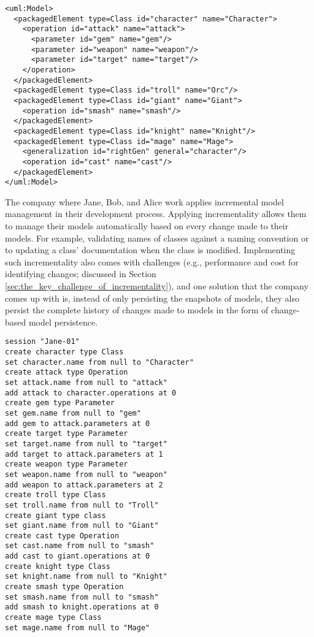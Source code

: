 \vspace{-20pt}
\begin{lstlisting}[style=xmi,caption={Simplified XMI file of the right version of Figure \ref{fig:class_diagram_right}.},label=lst:xmimodel_right]
<uml:Model>
  <packagedElement type=Class id="character" name="Character">
    <operation id="attack" name="attack">
      <parameter id="gem" name="gem"/>
      <parameter id="weapon" name="weapon"/>
      <parameter id="target" name="target"/>
    </operation>
  </packagedElement>
  <packagedElement type=Class id="troll" name="Orc"/>
  <packagedElement type=Class id="giant" name="Giant">
    <operation id="smash" name="smash"/>
  </packagedElement>
  <packagedElement type=Class id="knight" name="Knight"/>
  <packagedElement type=Class id="mage" name="Mage">
    <generalization id="rightGen" general="character"/>
    <operation id="cast" name="cast"/>
  </packagedElement>
</uml:Model>
\end{lstlisting}

The company where Jane, Bob, and Alice work applies incremental model management in their development process. Applying incrementality allows them to manage their models automatically based on every change made to their models. For example, validating names of classes against a naming convention or to updating a class' documentation when the class is modified. Implementing such incrementality also comes with challenges (e.g., performance and cost for identifying changes; discussed in Section \ref{sec:the_key_challenge_of_incrementality}), and one solution that the company comes up with is, instead of only persisting the snapshots of models, they also persist the complete history of changes made to models in the form of change-based model persistence. 

\begin{lstlisting}[style=eol,caption={Change-based representation of the original version in Figure \ref{fig:class_diagram_origin}.},label=lst:cbp_origin]
session "Jane-01"
create character type Class
set character.name from null to "Character" 
create attack type Operation
set attack.name from null to "attack" 
add attack to character.operations at 0
create gem type Parameter
set gem.name from null to "gem" 
add gem to attack.parameters at 0
create target type Parameter
set target.name from null to "target" 
add target to attack.parameters at 1
create weapon type Parameter
set weapon.name from null to "weapon" 
add weapon to attack.parameters at 2
create troll type Class
set troll.name from null to "Troll" 
create giant type class
set giant.name from null to "Giant"
create cast type Operation
set cast.name from null to "smash"
add cast to giant.operations at 0
create knight type Class
set knight.name from null to "Knight"
create smash type Operation
set smash.name from null to "smash"
add smash to knight.operations at 0
create mage type Class
set mage.name from null to "Mage" 
\end{lstlisting}


